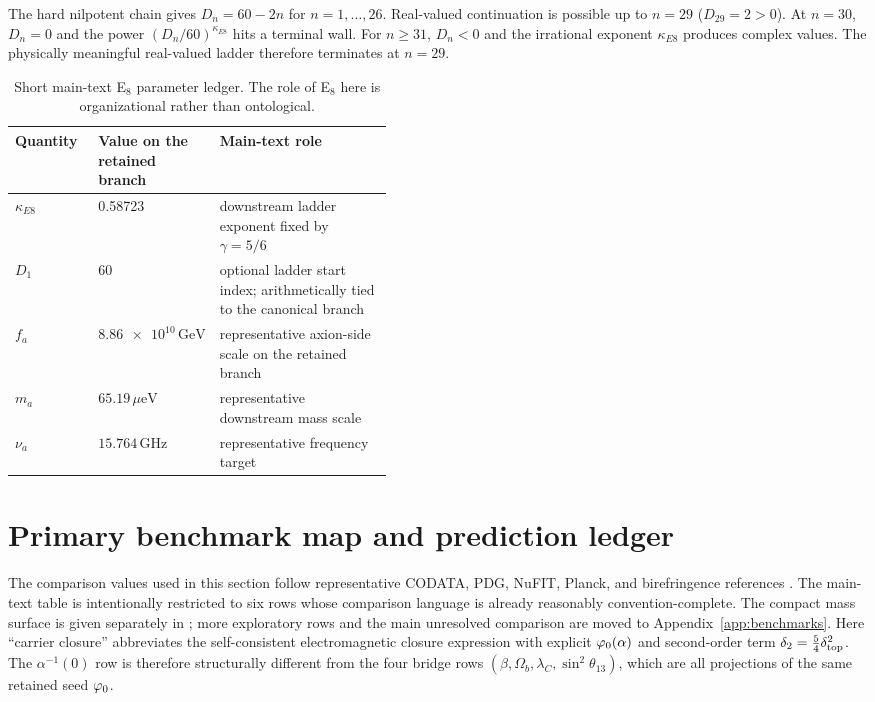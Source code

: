 \begin{remark}
The hard nilpotent chain gives $D_n=60-2n$ for $n=1,\dots,26$. Real-valued continuation is possible up to $n=29$ ($D_{29}=2>0$). At $n=30$, $D_n=0$ and the power $(D_n/60)^{\kappa_{E8}}$ hits a terminal wall. For $n\ge31$, $D_n<0$ and the irrational exponent $\kappa_{E8}$ produces complex values. The physically meaningful real-valued ladder therefore terminates at $n=29$.
\end{remark}

\begin{table}[t]
\centering
\small
\begin{tabularx}{\linewidth}{@{}>{\raggedright\arraybackslash}p{0.22\linewidth}>{\raggedright\arraybackslash}p{0.22\linewidth}Y@{}}
\toprule
Quantity & Value on the retained branch & Main-text role \\
\midrule
$\kappa_{E8}$ & \num{0.58723} & downstream ladder exponent fixed by $\gamma=5/6$ \\
$D_1$ & $60$ & optional ladder start index; arithmetically tied to the canonical branch \\
$f_a$ & $\num{8.86e10}\,\mathrm{GeV}$ & representative axion-side scale on the retained branch \\
$m_a$ & $\num{65.19}\,\mu\mathrm{eV}$ & representative downstream mass scale \\
$\nu_a$ & $\num{15.764}\,\mathrm{GHz}$ & representative frequency target \\
\bottomrule
\end{tabularx}
\caption{Short main-text E$_8$ parameter ledger. The role of E$_8$ here is organizational rather than ontological.}
\label{tab:e8-main-text}
\end{table}

\section{Primary benchmark map and prediction ledger}

The comparison values used in this section follow representative CODATA, PDG, NuFIT, Planck, and birefringence references \cite{codata2022,pdg2025,nufit2025,planck2018,minamiKomatsu2020,eskilt2023,sullivan2025}. The main-text table is intentionally restricted to six rows whose comparison language is already reasonably convention-complete. The compact mass surface is given separately in ; more exploratory rows and the main unresolved comparison are moved to Appendix~\ref{app:benchmarks}.
Here \enquote{carrier closure} abbreviates the self-consistent electromagnetic closure expression with explicit $\varphi_0(\alpha)$ and second-order term $\delta_2=\frac54\delta_{\mathrm{top}}^2$. The $\alpha^{-1}(0)$ row is therefore structurally different from the four bridge rows $(\beta,\Omega_b,\lambda_C,\sin^2\theta_{13})$, which are all projections of the same retained seed $\varphi_0$.

